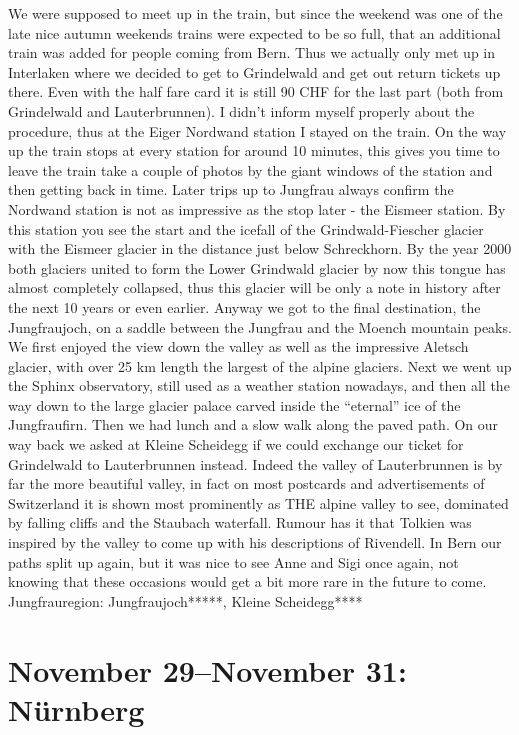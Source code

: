 We were supposed to meet up in the train, but since the weekend was one of the late nice autumn weekends trains were expected to be so full, that an additional train was added for people coming from Bern. Thus we actually only met up in Interlaken where we decided to get to Grindelwald and get out return tickets up there. Even with the half fare card it is still 90 CHF for the last part (both from Grindelwald and Lauterbrunnen). I didn't inform myself properly about the procedure, thus at the Eiger Nordwand station I stayed on the train. On the way up the train stops at every station for around 10 minutes, this gives you time to leave the train take a couple of photos by the giant windows of the station and then getting back in time. Later trips up to Jungfrau always confirm the Nordwand station is not as impressive as the stop later - the Eismeer station. By this station you see the start and the icefall of the Grindwald-Fiescher glacier with the Eismeer glacier in the distance just below Schreckhorn. By the year 2000 both glaciers united to form the Lower Grindwald glacier by now this tongue has almost completely collapsed, thus this glacier will be only a note in history after the next 10 years or even earlier. Anyway we got to the final destination, the Jungfraujoch, on a saddle between the Jungfrau and the Moench mountain peaks. We first enjoyed the view down the valley as well as the impressive Aletsch glacier, with over 25 km length the largest of the alpine glaciers. Next we went up the Sphinx observatory, still used as a weather station nowadays, and then all the way down to the large glacier palace carved inside the ``eternal'' ice of the Jungfraufirn. Then we had lunch and a slow walk along the paved path. On our way back we asked at Kleine Scheidegg if we could exchange our ticket for Grindelwald to Lauterbrunnen instead. Indeed the valley of Lauterbrunnen is by far the more beautiful valley, in fact on most postcards and advertisements of Switzerland it is shown most prominently as THE alpine valley to see, dominated by falling cliffs and the Staubach waterfall. Rumour has it that Tolkien was inspired by the valley to come up with his descriptions of Rivendell. In Bern our paths split up again, but it was nice to see Anne and Sigi once again, not knowing that these occasions would get a bit more rare in the future to come.\\

Jungfrauregion: Jungfraujoch*****, Kleine Scheidegg****

\section{November 29--November 31: N\"urnberg}
\label{2008:Nuernberg}

